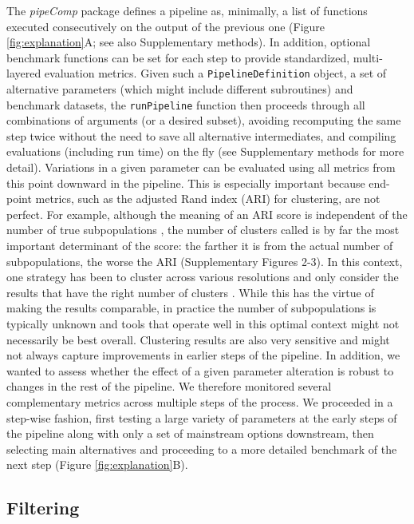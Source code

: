 \documentclass{bmcart}
\begin{document}
The \textit{pipeComp} package defines a pipeline as, minimally, a list of functions executed consecutively on the output of the previous one (Figure \ref{fig:explanation}A; see also Supplementary methods). In addition, optional benchmark functions can be set for each step to provide standardized, multi-layered evaluation metrics. Given such a \texttt{PipelineDefinition} object, a set of alternative parameters (which might include different subroutines) and benchmark datasets, the \texttt{runPipeline} function then proceeds through all combinations of arguments (or a desired subset), avoiding recomputing the same step twice without the need to save all alternative intermediates, and compiling evaluations (including run time) on the fly (see Supplementary methods for more detail). Variations in a given parameter can be evaluated using all metrics from this point downward in the pipeline. This is especially important because end-point metrics, such as the adjusted Rand index (ARI) \cite{HubertARI1985} for clustering, are not perfect. For example, although the meaning of an ARI score is independent of the number of true subpopulations \cite{steinleyProperties2004}, the number of clusters called is by far the most important determinant of the score: the farther it is from the actual number of subpopulations, the worse the ARI (Supplementary Figures 2-3). In this context, one strategy has been to cluster across various resolutions and only consider the results that have the right number of clusters \cite{duoClustering2018}. While this has the virtue of making the results comparable, in practice the number of subpopulations is typically unknown and tools that operate well in this optimal context might not necessarily be best overall. Clustering results are also very sensitive and might not always capture improvements in earlier steps of the pipeline. In addition, we wanted to assess whether the effect of a given parameter alteration is robust to changes in the rest of the pipeline. We therefore monitored several complementary metrics across multiple steps of the process. We proceeded in a step-wise fashion, first testing a large variety of parameters at the early steps of the pipeline along with only a set of mainstream options downstream, then selecting main alternatives and proceeding to a more detailed benchmark of the next step (Figure \ref{fig:explanation}B).

\subsection*{Filtering}
\end{document}

